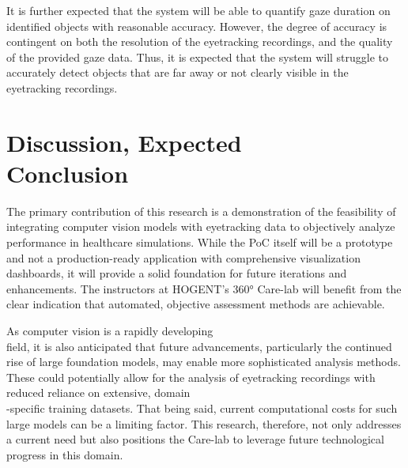 \documentclass[english]{hogent-article}
\begin{document}
It is further expected that the system will be able to quantify gaze duration on identified objects with reasonable accuracy.
However, the degree of accuracy is contingent on both the resolution of the eyetracking recordings, and the quality of the provided gaze data.
Thus, it is expected that the system will struggle to accurately detect objects that are far away or not clearly visible in the eyetracking recordings. 

\section{Discussion, Expected\\ Conclusion}
\label{sec:discussion-conclusion}

The primary contribution of this research is a demonstration of the feasibility of 
integrating computer vision models with eyetracking data to objectively analyze performance in healthcare simulations.
While the PoC itself will be a prototype and not a production-ready application with comprehensive visualization dashboards, 
it will provide a solid foundation for future iterations and enhancements.
The instructors at HOGENT's 360° Care-lab will benefit from the clear indication that automated, 
objective assessment methods are achievable.

As computer vision is a rapidly developing\\ field, it is also anticipated that future advancements, 
particularly the continued rise of large foundation models, may enable more sophisticated analysis methods. 
These could potentially allow for the analysis of eyetracking recordings with reduced reliance on extensive, 
domain\\-specific training datasets. That being said, current computational costs for such large models can be a limiting factor. 
This research, therefore, not only addresses a current need but also positions the Care-lab to leverage future technological\\ progress in this domain.

\begingroup
\setlength{\emergencystretch}{3em}
\printbibliography[heading=bibintoc]
\endgroup
\end{document}

